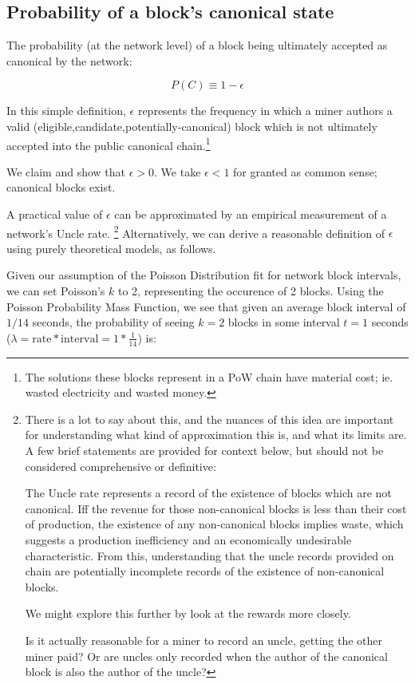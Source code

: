 \documentclass[11pt]{article}
\theoremstyle{plain}
\begin{document}
\subsection{\normalsize{Probability of a block's canonical state}}

The probability (at the network level) of a block being ultimately accepted as
canonical by the network:

\begin{equation}
P(C) \equiv 1 - \epsilon
\end{equation}

In this simple definition, $\epsilon$ represents the frequency in which a miner
authors a valid (eligible,candidate,potentially-canonical) block which is not
ultimately accepted into the public canonical chain.\footnote{The solutions
these blocks represent in a PoW chain have material cost; ie. wasted
electricity and wasted money.}

We claim and show that $\epsilon > 0$. We take $\epsilon < 1$ for granted as
common sense; canonical blocks exist.

A practical value of $\epsilon$ can be approximated by an empirical measurement
of a network's Uncle rate.\nolinebreak
\footnote{
  There is a lot to say about this, and the nuances of this idea are important
for understanding what kind of approximation this is, and what its limits are.
  A few brief statements are provided for context below, but should not be
considered comprehensive or definitive:

  The Uncle rate represents a record of the existence of blocks which are not
canonical.
  Iff the revenue for those non-canonical blocks is less than their cost of
production, the existence of any non-canonical blocks implies waste, which
suggests a production inefficiency and an economically undesirable
characteristic.
  From this, understanding that the uncle records provided on chain are
potentially incomplete records of the existence of non-canonical blocks.

  We might explore this further by look at the rewards more closely.

  Is it actually reasonable for a miner to record an uncle, getting the
  other miner paid? Or are uncles only recorded when the author of the
  canonical block is also the author of the uncle?
}
Alternatively, we can derive a reasonable definition of $\epsilon$ using purely
theoretical models, as follows.

Given our assumption of the Poisson Distribution fit for network block
intervals, we can set Poisson's $k$ to 2, representing the occurence of 2
blocks.
Using the Poisson Probability Mass Function, we see that given an average block
interval of $1/14$ seconds, the probability of seeing $k=2$ blocks in some
interval $t=1$ seconds
($\lambda=\mathrm{rate}*\mathrm{interval}=1*\frac{1}{14}$) is:
\end{document}
